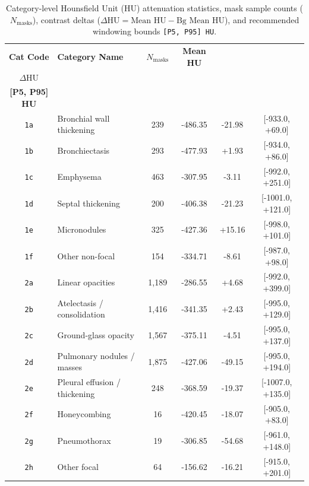 \documentclass[11pt,a4paper]{article}
\begin{document}
\begin{table}[htbp]
\centering
\caption{Category-level Hounsfield Unit (HU) attenuation statistics, mask sample counts ($N_{\text{masks}}$), contrast deltas ($\Delta \text{HU} = \text{Mean HU} - \text{Bg Mean HU}$), and recommended windowing bounds \texttt{[P5, P95] HU}.}
\label{tab:hu_stats}
\scriptsize
\setlength{\tabcolsep}{2.5pt}
\begin{tabularx}{\linewidth}{c >{\raggedright\arraybackslash}X c c c c}
\toprule
\textbf{Cat Code} & \textbf{Category Name} & \textbf{$N_{\text{masks}}$} & \textbf{Mean HU} & \makecell{\textbf{Contrast}\\\textbf{$\Delta\text{HU}$}} & \makecell{\textbf{Rec Window}\\\textbf{[P5, P95] HU}} \\
\midrule
\texttt{1a} & Bronchial wall thickening & 239 & -486.35 & -21.98 & [-933.0, +69.0] \\
\texttt{1b} & Bronchiectasis & 293 & -477.93 & +1.93 & [-934.0, +86.0] \\
\texttt{1c} & Emphysema & 463 & -307.95 & -3.11 & [-992.0, +251.0] \\
\texttt{1d} & Septal thickening & 200 & -406.38 & -21.23 & [-1001.0, +121.0] \\
\texttt{1e} & Micronodules & 325 & -427.36 & +15.16 & [-998.0, +101.0] \\
\texttt{1f} & Other non-focal & 154 & -334.71 & -8.61 & [-987.0, +98.0] \\
\texttt{2a} & Linear opacities & 1,189 & -286.55 & +4.68 & [-992.0, +399.0] \\
\texttt{2b} & Atelectasis / consolidation & 1,416 & -341.35 & +2.43 & [-995.0, +129.0] \\
\texttt{2c} & Ground-glass opacity & 1,567 & -375.11 & -4.51 & [-995.0, +137.0] \\
\texttt{2d} & Pulmonary nodules / masses & 1,875 & -427.06 & -49.15 & [-995.0, +194.0] \\
\texttt{2e} & Pleural effusion / thickening & 248 & -368.59 & -19.37 & [-1007.0, +135.0] \\
\texttt{2f} & Honeycombing & 16 & -420.45 & -18.07 & [-905.0, +83.0] \\
\texttt{2g} & Pneumothorax & 19 & -306.85 & -54.68 & [-961.0, +148.0] \\
\texttt{2h} & Other focal & 64 & -156.62 & -16.21 & [-915.0, +201.0] \\
\bottomrule
\end{tabularx}
\end{table}
\end{document}
